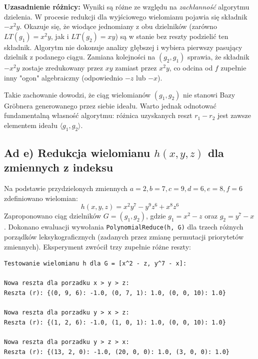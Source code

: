 \documentclass[a4paper,11pt]{article}
\begin{document}
\textbf{Uzasadnienie różnicy:} 
Wyniki są różne ze względu na \textit{zachłanność} algorytmu dzielenia. W procesie redukcji dla wyjściowego wielomianu pojawia się składnik $-x^2y$. Okazuje się, że wiodące jednomiany z obu dzielników (zarówno $LT(g_1) = x^2y$, jak i $LT(g_2) = xy$) są w stanie bez reszty podzielić ten składnik. Algorytm nie dokonuje analizy głębszej i wybiera pierwszy pasujący dzielnik z podanego ciągu. Zamiana kolejności na $(g_2, g_1)$ sprawia, że składnik $-x^2y$ zostaje zredukowany przez $xy$ zamiast przez $x^2y$, co odcina od $f$ zupełnie inny "ogon" algebraiczny (odpowiednio $-z$ lub $-x$).

Takie zachowanie dowodzi, że ciąg wielomianów $(g_1, g_2)$ nie stanowi Bazy Gröbnera generowanego przez siebie ideału. Warto jednak odnotować fundamentalną własność algorytmu: różnica uzyskanych reszt $r_1 - r_2$ jest zawsze elementem ideału $\langle g_1, g_2 \rangle$.

\subsection{Ad e) Redukcja wielomianu $h(x,y,z)$ dla zmiennych z indeksu}
Na podstawie przydzielonych zmiennych $a=2, b=7, c=9, d=6, e=8, f=6$ zdefiniowano wielomian:
\begin{equation}
    h(x,y,z) = x^2 y^7 - y^9 z^6 + x^8 z^6
\end{equation}
Zaproponowano ciąg dzielników $G = (g_1, g_2)$, gdzie $g_1 = x^2 - z$ oraz $g_2 = y^7 - x$. 
Dokonano ewaluacji wywołania \texttt{PolynomialReduce(h, G)} dla trzech różnych porządków leksykograficznych (zadanych przez zmianę permutacji priorytetów zmiennych). Eksperyment zwrócił trzy zupełnie różne reszty:

\begin{lstlisting}[basicstyle=\ttfamily\small, frame=single, title={Wynik z terminala}]
Testowanie wielomianu h dla G = [x^2 - z, y^7 - x]:

Nowa reszta dla porzadku x > y > z:
Reszta (r): {(0, 9, 6): -1.0, (0, 7, 1): 1.0, (0, 0, 10): 1.0}

Nowa reszta dla porzadku y > x > z:
Reszta (r): {(1, 2, 6): -1.0, (1, 0, 1): 1.0, (0, 0, 10): 1.0}

Nowa reszta dla porzadku y > z > x:
Reszta (r): {(13, 2, 0): -1.0, (20, 0, 0): 1.0, (3, 0, 0): 1.0}
\end{lstlisting}
\end{document}
